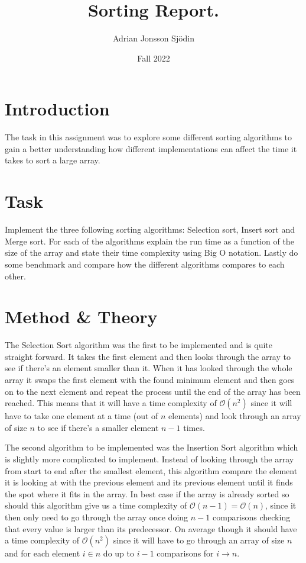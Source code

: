 \documentclass[a4paper,11pt]{article}
\begin{document}
\title{
    \textbf{Sorting Report.}
}
\author{Adrian Jonsson Sjödin}
\date{Fall 2022}

\maketitle

\section*{Introduction}
The task in this assignment was to explore some different sorting algorithms to gain a
better understanding how different implementations can affect the time it takes to sort
a large array.
\section*{Task}
Implement the three following sorting algorithms: Selection sort, Insert sort and Merge
sort. For each of the algorithms explain the run time as a function of the size of the
array and state their time complexity using Big O notation. Lastly do some benchmark and
compare how the different algorithms compares to each other.

\section*{Method \& Theory}
The Selection Sort algorithm was the first to be implemented and is quite straight forward.
It takes the first element and then looks through the array to see if there's an element
smaller than it. When it has looked through the whole array it swaps the first element with
the found minimum element and then goes on to the next element and repeat the process
until the end of the array has been reached. This means that it will have a time complexity
of $\mathcal{O}(n^2)$ since it will have to take one element at a time (out of $n$ elements)
and look through an array of size $n$ to see if there's a smaller element $n-1$ times.

The second algorithm to be implemented was the Insertion Sort algorithm which is slightly
more complicated to implement. Instead of looking through the array from start to end after the smallest element, this algorithm
compare the element it is looking at with the previous element and its previous element until it finds the spot where it fits in
the array. In best case if the array is already sorted so should this algorithm give us a time complexity of $\mathcal{O}(n-1)=\mathcal{O}(n)$,
since it then only need to go through the array once doing $n-1$ comparisons checking that every value is larger than its predecessor.
On average though it should have a time complexity of $\mathcal{O}(n^2)$ since it will have to go through an array of size $n$ and for each element $i\in n$
do up to $i-1$ comparisons for $i \to n$.
\end{document}
